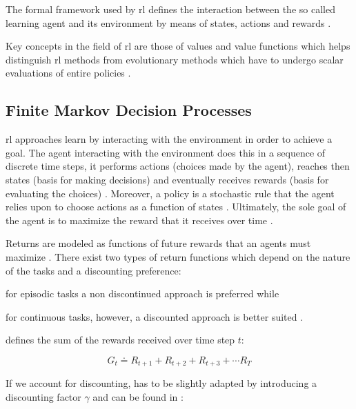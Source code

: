 \documentclass{seal_thesis}
\begin{document}
The formal framework used by \gls{rl} defines the interaction between the so called learning agent and its environment by means of states, actions and rewards \cite[p. 15]{Sutton2017}.

Key concepts in the field of \gls{rl} are those of values and value functions which helps distinguish \gls{rl} methods from evolutionary methods which have to undergo scalar evaluations of entire policies \cite[p. 15]{Sutton2017}.

\subsection{Finite Markov Decision Processes}

\gls{rl} approaches learn by interacting with the environment in order to achieve a goal. The agent interacting with the environment does this in a sequence of discrete time steps, it performs actions (choices made by the agent), reaches then states (basis for making decisions) and eventually receives rewards (basis for evaluating the choices) \cite[p. 73]{Sutton2017}. Moreover, a policy is a stochastic rule that the agent relies upon to choose actions as a function of states \cite[p. 73]{Sutton2017}. Ultimately, the sole goal of the agent is to maximize the reward that it receives over time \cite[p. 73]{Sutton2017}.

Returns are modeled as functions of future rewards that an agents must maximize \cite[p. 73]{Sutton2017}. There exist two types of return functions which depend on the nature of the tasks and a discounting preference:
\begin{enumerate*}
	\item for episodic tasks a non discontinued approach is preferred while
	\item for continuous tasks, however, a discounted approach is better suited \cite[p. 73]{Sutton2017}.
\end{enumerate*}

 defines the sum of the rewards received over time step $t$:

\begin{equation}
\label{eq:expected_return}
	G_t  \doteq R_{t+1} + R_{t+2} + R_{t+3} + \cdots R_{T}
\end{equation}

If we account for discounting,  has to be slightly adapted by introducing a discounting factor $\gamma$ and can be found in :
\end{document}
